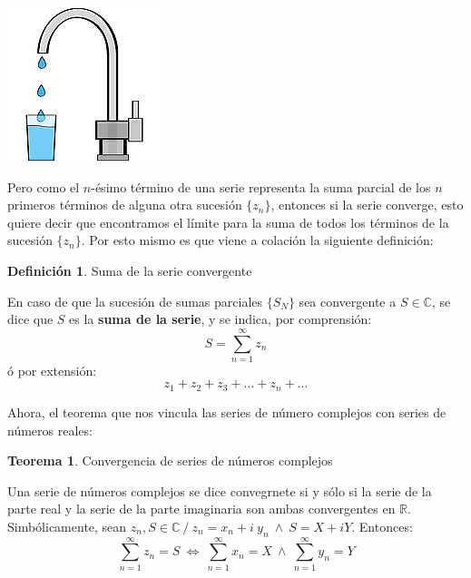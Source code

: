 \documentclass[12pt]{article}
\theoremstyle{definition}
\newtheorem{definition}{Definici\'on}[section]
\theoremstyle{theorem}
\newtheorem{theorem}{Teorema}[section]
\theoremstyle{corolary}
\theoremstyle{method}
\begin{document}
\begin{center}
	\includegraphics[scale=0.5]{suma_parcial.jpg}
\end{center}

Pero como el $n$-\'esimo t\'ermino de una serie representa la suma parcial de los $n$ primeros t\'erminos de alguna otra sucesi\'on $\{z_n\}$, entonces si la serie converge, esto quiere decir que encontramos el l\'imite para la suma de todos los t\'erminos de la sucesi\'on $\{z_n\}$. Por esto mismo es que viene a colaci\'on la siguiente definici\'on:\\

\colorbox{violet!40!white!80}{\parbox{\linewidth}{
\theoremstyle{definition}
\begin{definition}{Suma de la serie convergente}

En caso de que la sucesi\'on de sumas parciales $\{S_N\}$ sea convergente a $S \in \mathbb{C}$, se dice que $S$ es la \textbf{suma de la serie}, y se indica, por comprensi\'on: $$S=\sum\limits_{n=1}^{\infty}z_n$$
\'o por extensi\'on: $$z_1+z_2+z_3+...+z_n+...$$
\end{definition}}}
\linebreak
\linebreak


Ahora, el teorema que nos vincula las series de n\'umero complejos con series de n\'umeros reales:\\

\colorbox{red!40!white!80}{\parbox{\linewidth}{
\theoremstyle{theorem}
\begin{theorem} {Convergencia de series de n\'umeros complejos}

Una serie de n\'umeros complejos se dice convegrnete si y s\'olo si la serie de la parte real y la serie de la parte imaginaria son ambas convergentes en $\mathbb{R}$.\\
Simb\'olicamente, sean $z_n,S \in \mathbb{C}\ /\ z_n = x_n + i\ y_n\:\land\:S = X + i Y$. Entonces: $$\sum\limits_{n=1}^{\infty}z_n=S\ \Leftrightarrow\ \sum\limits_{n=1}^{\infty}x_n = X\:\land\:\sum\limits_{n=1}^{\infty}y_n=Y$$
\end{theorem}}}
\linebreak
\linebreak
\end{document}
